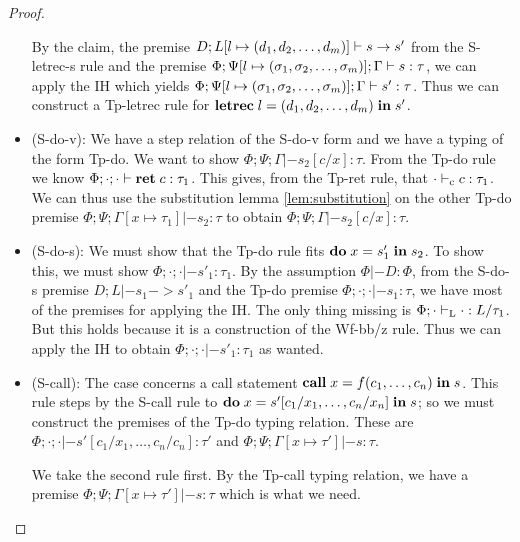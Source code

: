 \documentclass[a4paper, oneside, 10pt, draft]{memoir}
\begin{document}
\begin{proof}
\begin{itemize}
    By the claim, the premise $D;L[l\mapsto (d_1, d_2, \dotsc, d_m)] |- s -> s'$
    from the S-letrec-s rule and the premise $\Phi;\Psi[l \mapsto
    (\sigma_1, \sigma_2, \dotsc, \sigma_m)];\Gamma |- s : \tau$, we can apply the IH which yields $\Phi;\Psi[l \mapsto
    (\sigma_1, \sigma_2, \dotsc, \sigma_m)];\Gamma |- s' : \tau$. Thus we can construct a Tp-letrec
    rule for $\mathbf{letrec} \; l = (d_1, d_2, \dotsc, d_m) \; \mathbf{in} \; s'$.
  \item (S-do-v):
    We have a step relation of the S-do-v form and we have a typing of
    the form Tp-do. We want to show $\Phi;\Psi;\Gamma |- s_2[c/x] :
    \tau$. From the Tp-do rule we know $\Phi;\cdot;\cdot |- \mathbf{ret} \; c :
    \tau_1$. This gives, from the Tp-ret rule, that $\cdot |-_{\mathrm{c}} c :
    \tau_1$. We can thus use the substitution lemma
    \ref{lem:substitution} on the other Tp-do premise
    $\Phi;\Psi;\Gamma[x \mapsto \tau_1] |- s_2 : \tau$ to obtain
    $\Phi;\Psi;\Gamma |- s_2[c/x] : \tau$.
  \item (S-do-s): We must show that the Tp-do rule fits
    $\mathbf{do} \; x = s'_1 \; \mathbf{in} \; s_2$. To show this, we must show $\Phi;\cdot;\cdot
    |- s'_1 : \tau_1$. By the assumption $\Phi |- D : \Phi$, from the
    S-do-s premise $D;L |- s_1 -> s'_1$ and the Tp-do premise
    $\Phi;\cdot;\cdot |- s_1 : \tau$, we have most of the premises for
    applying the IH. The only thing missing is $\Phi;\cdot |-_{\mathrm{L}} \cdot
    : L / \tau_1$. But this holds because it is a construction of the
    Wf-bb/z rule. Thus we can apply the IH to obtain $\Phi;\cdot;\cdot
    |- s'_1 : \tau_1$ as wanted.
  \item (S-call):
    The case concerns a call statement
    $\mathbf{call} \; x = f (c_1,\dotsc,c_n)\; \mathbf{in} \; s$. This rule steps by the S-call
    rule to $\mathbf{do} \; x = s'[c_1/x_1,\dotsc,c_n/x_n] \; \mathbf{in} \; s$; so we
    must construct the premises of the Tp-do typing relation. These are
    $\Phi;\cdot;\cdot |- s'[c_1/x_1,\dotsc,c_n/c_n] : \tau'$ and
    $\Phi;\Psi;\Gamma[x \mapsto  \tau'] |- s : \tau$.

    We take the second rule first. By the Tp-call typing relation, we
    have a premise $\Phi;\Psi;\Gamma[x \mapsto \tau'] |- s : \tau$
    which is what we need.


\end{itemize}
\end{proof}
\end{document}
